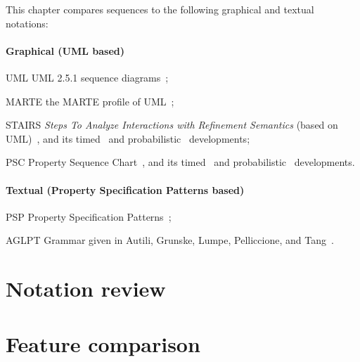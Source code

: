 
This chapter compares \langname{} sequences to the following graphical
and textual notations:

\newcommand{\featname}[1]{\textsf{#1}}

\paragraph{Graphical (UML based)}

\begin{featset}
\item[UML] UML 2.5.1 sequence diagrams~\cite{uml251};
\item[MARTE] the MARTE profile of UML~\cite{marte12};
\item[STAIRS] \emph{Steps To Analyze Interactions with Refinement Semantics} (based on UML)~\cite{Haugen03-STAIRS},
and its timed~\cite{Haugen05-TimedSTAIRS} and
probabilistic~\cite{Refsdal05-ProbabilisticSTAIRS} developments;
\item[PSC] Property Sequence Chart~\cite{psc}, and its
timed~\cite{tpsc} and probabilistic~\cite{ptpsc} developments.
\end{featset}

\paragraph{Textual (Property Specification Patterns based)}

\begin{featset}
\item[PSP] Property Specification Patterns~\cite{psp,pspsite};
\item[AGLPT] Grammar given in Autili, Grunske, Lumpe, Pelliccione, and Tang~\cite{aglpt}.
\end{featset}

\section{Notation review}\label{sec:seq-comparison-review}


\section{Feature comparison}\label{sec:seq-comparison-features}


